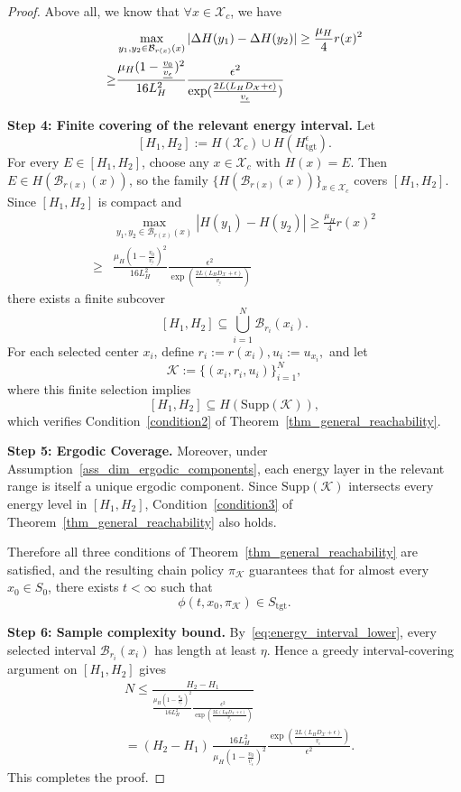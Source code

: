\documentclass[10pt,a4paper]{amsart}
\newcommand{\K}{\mathcal{K}}
\newcommand{\Supp}{\mathrm{Supp}}
\newcommand{\X}{\mathcal{X}}
\newcommand{\cB}{\mathcal{B}}
\newcommand{\tgt}{\mathrm{tgt}}
\begin{document}
\begin{proof}
Above all, we know that $\forall x \in \X_c$, we have
\begin{align}
& \max_{y_1,y_2\in \cB_{r(x)}(x)} |\Delta H(y_1)- \Delta H(y_2)| \ge \frac{\mu_{H}}{4}r(x)^2 \notag\\
\ge & \frac{\mu_{H} (1-\frac{v_0}{\underline{v_\epsilon}})^2}{16L_H^2}\frac{\epsilon^2}{\exp(\frac{2L(L_HD_{\mathcal{X}}+\epsilon)}{\underline{v_\epsilon}})} \label{eq:energy_interval_lower}
\end{align}

\noindent\textbf{Step 4: Finite covering of the relevant energy interval.}
Let \[
[H_1,H_2]:=H(\X_c)\cup H(H_{\tgt}^\epsilon).
\]
For every $E\in[H_1,H_2]$, choose any $x\in\X_c$ with $H(x)=E$.
Then $E\in H(\cB_{r(x)}(x))$, so the family $\{H(\cB_{r(x)}(x))\}_{x\in\X_c}$ covers $[H_1,H_2]$.
Since $[H_1,H_2]$ is compact and 
\begin{align*}
& \max_{y_1,y_2\in \cB_{r(x)}(x)} |H(y_1)-H(y_2)| \geq \frac{\mu_{H}}{4}r(x)^2\\
\ge & \frac{\mu_{H} (1-\frac{v_0}{\underline{v_\epsilon}})^2}{16L_H^2}\frac{\epsilon^2}{\exp(\frac{2L(L_HD_{\mathcal{X}}+\epsilon)}{\underline{v_\epsilon}})}
\end{align*} there exists a finite subcover
\[
[H_1,H_2]\subseteq \bigcup_{i=1}^N \cB_{r_i}(x_i).
\]
For each selected center $x_i$, define $r_i:=r(x_i), u_i:=u_{x_i},$ and let
\[
\K:=\{(x_i,r_i,u_i)\}_{i=1}^N,
\]
where this finite selection implies
\[
[H_1,H_2]\subseteq H(\Supp(\K)),
\]
which verifies Condition~\ref{condition2} of
Theorem~\ref{thm_general_reachability}.

\noindent\textbf{Step 5: Ergodic Coverage.}
Moreover, under Assumption~\ref{ass_dim_ergodic_components},
each energy layer in the relevant range is itself a unique ergodic component.
Since $\Supp(\K)$ intersects every energy level in $[H_1,H_2]$,
Condition~\ref{condition3} of
Theorem~\ref{thm_general_reachability} also holds.

Therefore all three conditions of
Theorem~\ref{thm_general_reachability} are satisfied, and the resulting
chain policy $\pi_{\K}$ guarantees that for almost every $x_0\in S_0$,
there exists $t<\infty$ such that
\[
\phi(t,x_0,\pi_{\K})\in S_{\tgt}.
\]

\noindent\textbf{Step 6: Sample complexity bound.}
By~\eqref{eq:energy_interval_lower}, every selected interval $\cB_{r_i}(x_i)$
has length at least $\eta$. Hence a greedy interval-covering argument on
$[H_1,H_2]$ gives
\begin{align*}
& N \le \frac{H_2-H_1}{\frac{\mu_{H} (1-\frac{v_0}{\underline{v_\epsilon}})^2}{16L_H^2}\frac{\epsilon^2}{\exp(\frac{2L(L_HD_{\mathcal{X}}+\epsilon)}{\underline{v_\epsilon}})}}\\
& =
(H_2-H_1)\,
\frac{16L_H^2}
{\mu_H\left(1-\frac{v_0}{\underline v_\epsilon}\right)^2}
\frac{
\exp\!\left(
\frac{2L(L_HD_{\X}+\epsilon)}{\underline v_\epsilon}
\right)}
{\epsilon^2}.
\end{align*}
This completes the proof.
\end{proof}
\end{document}
